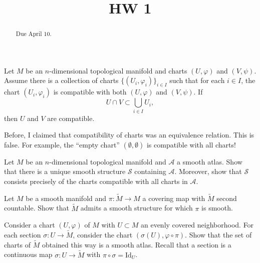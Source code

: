 \documentclass{ximera}
\title{HW 1}
\begin{document}
    \begin{abstract}  Due April 10.  \end{abstract}
    \maketitle



\begin{exercise}
    Let $M$ be an $n$-dimensional topological manifold and charts $(U, \varphi )$ and $(V, \psi )$. Assume there is a collection of charts $\{ (U_i, \varphi _i ) \} _{i \in I} $  such that for each $i \in I$, the chart $(U_i, \varphi_i ) $ is compatible with both $(U, \varphi) $ and $(V, \psi)$. If 
    \[    U \cap V \subset \bigcup_{i \in I} U_i ,  \]
    then $U$ and $V$ are compatible. 

    \begin{remark}
        Before, I claimed that compatibility of charts was an equivalence relation. This is false. For example, the ``empty chart'' $(\emptyset , \emptyset )$ is compatible with all charts!
    \end{remark}
\end{exercise}


\begin{exercise}
    Let $M$ be an $n$-dimensional topological manifold and $\mathcal{A}$ a smooth atlas. Show that there is a unique smooth structure $\mathcal{S}$ containing $\mathcal{A}$. Moreover, show that $\mathcal{S}$ consists precisely of the charts compatible with all charts in $\mathcal{A}$.


\end{exercise}




\begin{exercise}
Let $M$ be a smooth manifold and $\pi : \tilde{M} \to M$ a covering map with $\tilde{M}$ second countable. Show that $\tilde{M}$ admits a smooth structure for which $\pi$ is smooth. 
\begin{hint}
    Consider a chart $(U, \varphi)$ of $M$ with $U \subset M $ an evenly covered neighborhood. For each section $ \sigma :  U \to \tilde{M} $, consider the chart $(\sigma (U) , \varphi \circ \pi  )$. Show that the set of charts of $\tilde{M}$ obtained this way is a smooth atlas. Recall that a section is a continuous map $\sigma : U \to \tilde{M}$ with $\pi \circ \sigma = \text{Id}_U$.
\end{hint}
\end{exercise}
\end{document}
